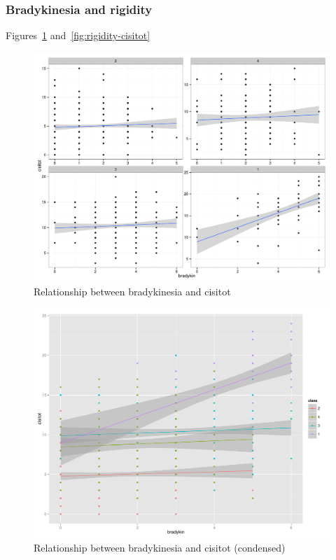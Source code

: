 \documentclass[letterpaper,12pt]{article}
\begin{document}
\subsubsection{Bradykinesia and rigidity}

Figures~\ref{fig:bradykin-cisitot} and~\ref{fig:rigidity-cisitot}

\begin{figure}[h]
  \centering
  \includegraphics[width=\linewidth]{bradykin-cisitot.pdf}
  \caption{Relationship between bradykinesia and cisitot}
  \label{fig:bradykin-cisitot}
\end{figure}

\begin{figure}[h]
  \centering
  \includegraphics[width=\linewidth]{bradykin-cisitot-condensed.pdf}
  \caption{Relationship between bradykinesia and cisitot (condensed)}
  \label{fig:bradykin-cisitot-condensed}
\end{figure}
\end{document}
